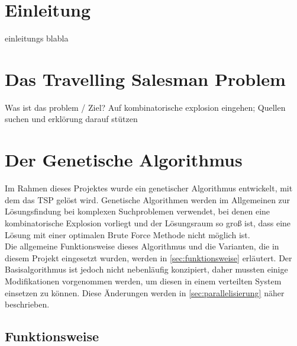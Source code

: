 \documentclass[12pt,a4paper]{scrreprt}
\newcommand{\absatz}{\\[12pt]}
\begin{document}


\tableofcontents

\setlength{\parindent}{0pt}

\chapter{Einleitung}
\label{chap:einleitung}

einleitungs blabla

\chapter{Das Travelling Salesman Problem}
\label{chap:tsp}

Was ist das problem / Ziel? Auf kombinatorische explosion eingehen; Quellen suchen und erklörung darauf stützen

\chapter{Der Genetische Algorithmus}
\label{chap:algorithmus}

Im Rahmen dieses Projektes wurde ein genetischer Algorithmus entwickelt, mit dem das TSP gelöst wird. Genetische Algorithmen werden im Allgemeinen zur Lösungsfindung bei komplexen Suchproblemen verwendet, bei denen eine kombinatorische Explosion vorliegt und der Lösungsraum so groß ist, dass eine Lösung mit einer optimalen Brute Force Methode nicht möglich ist.\absatz
Die allgemeine Funktionsweise dieses Algorithmus und die Varianten, die in diesem Projekt eingesetzt wurden, werden in \autoref{sec:funktionsweise} erläutert. Der Basisalgorithmus ist jedoch nicht nebenläufig konzipiert, daher mussten einige Modifikationen vorgenommen werden, um diesen in einem verteilten System einsetzen zu können. Diese Änderungen werden in \autoref{sec:parallelisierung} näher beschrieben.

\section{Funktionsweise}
\label{sec:funktionsweise}
\end{document}
